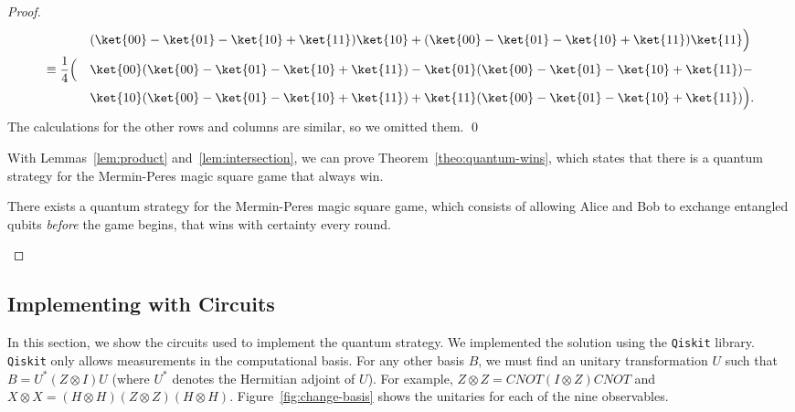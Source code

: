 \documentclass{llncs}
\newcommand{\cnot}{\mathit{CNOT}}
\begin{document}
\begin{proof}
\begin{alignat}{2}
    & &&(\ket{00} - \ket{01} - \ket{10} + \ket{11}) \ket{10} +
      (\ket{00} - \ket{01} - \ket{10} + \ket{11}) \ket{11}
    \Bigr) \nonumber \\
    \equiv\;
    & \frac{1}{4} \Bigl(
      &&\ket{00} (\ket{00} - \ket{01} - \ket{10} + \ket{11}) -
        \ket{01} (\ket{00} - \ket{01} - \ket{10} + \ket{11}) - \nonumber \\
    & &&\ket{10} (\ket{00} - \ket{01} - \ket{10} + \ket{11}) +
         \ket{11} (\ket{00} - \ket{01} - \ket{10} + \ket{11})
         \Bigr).
  \end{alignat}
  The calculations for the other rows and columns are similar, so we omitted them.
  \qed

  With Lemmas~\ref{lem:product} and~\ref{lem:intersection}, we can prove
  Theorem~\ref{theo:quantum-wins}, which states that there is a quantum strategy
  for the Mermin-Peres magic square game that always win.

  \begin{theorem}
    \label{theo:quantum-wins}
    There exists a quantum strategy for the Mermin-Peres magic square
    game, which consists of allowing Alice and Bob to exchange
    entangled qubits \emph{before} the game begins, that wins with
    certainty every round.
  \end{theorem}
\end{proof}

\subsection{Implementing with Circuits}
In this section, we show the circuits used to implement the quantum
strategy. We implemented the solution using the \texttt{Qiskit}
library. \texttt{Qiskit} only allows measurements in the computational
basis. For any other basis \(B\), we must find an unitary
transformation \(U\) such that \(B = U^{*} (Z \otimes I) U\) (where
\(U^{*}\) denotes the Hermitian adjoint of \(U\)). For example,
\(Z \otimes Z = \cnot{} (I \otimes Z) \cnot{}\) and
\(X \otimes X = (H \otimes H) (Z \otimes Z) (H \otimes H)\). Figure~\ref{fig:change-basis}
shows the unitaries for each of the nine observables.
\end{document}
